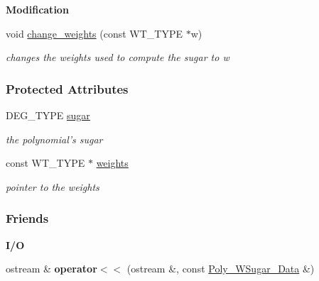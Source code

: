 \begin{Indent}\textbf{ Modification}\par
\begin{DoxyCompactItemize}
\item 
\mbox{\label{group__strategygroup_aa8fbd9cf3d9e391a9db0ececdabea03f}} 
void \hyperlink{group__strategygroup_aa8fbd9cf3d9e391a9db0ececdabea03f}{change\+\_\+weights} (const W\+T\+\_\+\+T\+Y\+PE $\ast$w)
\begin{DoxyCompactList}\small\item\em changes the weights used to compute the sugar to {\ttfamily w} \end{DoxyCompactList}\end{DoxyCompactItemize}
\end{Indent}
\subsubsection*{Protected Attributes}
\begin{DoxyCompactItemize}
\item 
\mbox{\label{group__strategygroup_a8a3f679ee5536587a4794a8c20b92cb9}} 
D\+E\+G\+\_\+\+T\+Y\+PE \hyperlink{group__strategygroup_a8a3f679ee5536587a4794a8c20b92cb9}{sugar}
\begin{DoxyCompactList}\small\item\em the polynomial's sugar \end{DoxyCompactList}\item 
\mbox{\label{group__strategygroup_acbe98e7f937ab0c074a732becdd8c619}} 
const W\+T\+\_\+\+T\+Y\+PE $\ast$ \hyperlink{group__strategygroup_acbe98e7f937ab0c074a732becdd8c619}{weights}
\begin{DoxyCompactList}\small\item\em pointer to the weights \end{DoxyCompactList}\end{DoxyCompactItemize}
\subsubsection*{Friends}
\begin{Indent}\textbf{ I/O}\par
\begin{DoxyCompactItemize}
\item 
\mbox{\label{group__strategygroup_aaa672dbee5334fe3b57404502489f800}} 
ostream \& {\bfseries operator$<$$<$} (ostream \&, const \hyperlink{group__strategygroup_class_poly___w_sugar___data}{Poly\+\_\+\+W\+Sugar\+\_\+\+Data} \&)
\end{DoxyCompactItemize}
\end{Indent}


